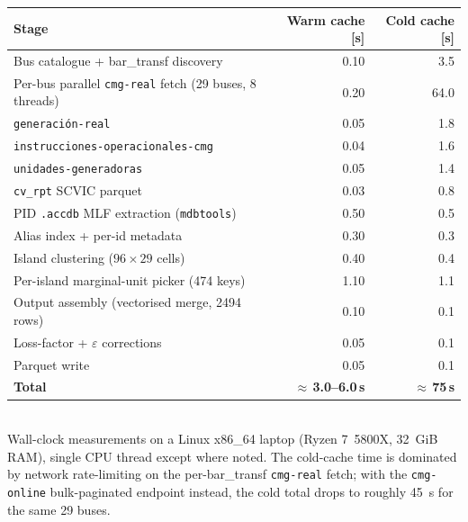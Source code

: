 \begin{tabular}{l r r}
  \toprule
  Stage                                       & Warm cache [s] & Cold cache [s] \\
  \midrule
  Bus catalogue + bar\_transf discovery       & 0.10           &  3.5 \\
  Per-bus parallel \texttt{cmg-real} fetch (29 buses, 8 threads) & 0.20 & 64.0 \\
  \texttt{generaci\'on-real}                  & 0.05           &  1.8 \\
  \texttt{instrucciones-operacionales-cmg}    & 0.04           &  1.6 \\
  \texttt{unidades-generadoras}               & 0.05           &  1.4 \\
  \texttt{cv\_rpt} SCVIC parquet              & 0.03           &  0.8 \\
  PID \texttt{.accdb} MLF extraction (\texttt{mdbtools}) & 0.50 & 0.5 \\
  Alias index + per-id metadata               & 0.30           &  0.3 \\
  Island clustering ($96\!\times\!29$ cells)  & 0.40           &  0.4 \\
  Per-island marginal-unit picker (\num{474} keys) & 1.10      &  1.1 \\
  Output assembly (vectorised merge, \num{2494} rows) & 0.10   &  0.1 \\
  Loss-factor + $\varepsilon$ corrections     & 0.05           &  0.1 \\
  Parquet write                               & 0.05           &  0.1 \\
  \midrule
  \textbf{Total}                              & \textbf{$\approx$\,3.0–6.0\,s} & \textbf{$\approx$\,75\,s} \\
  \bottomrule
\end{tabular}
\\[3pt]
{\footnotesize Wall-clock measurements on a Linux x86\_64 laptop
(Ryzen 7~5800X, \SI{32}{GiB} RAM), single CPU thread except where
noted.  The cold-cache time is dominated by network rate-limiting
on the per-bar\_transf \texttt{cmg-real} fetch; with the
\texttt{cmg-online} bulk-paginated endpoint instead, the cold
total drops to roughly \SI{45}{\second} for the same \num{29} buses.}
